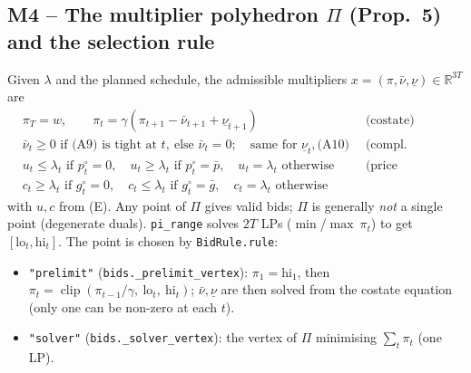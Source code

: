 \documentclass[10pt,a4paper]{article}
\newcommand{\code}[1]{\texttt{#1}}
\newcommand{\nuU}{\bar\nu}
\newcommand{\nuL}{\underline\nu}
\begin{document}
\subsection{M4 -- The multiplier polyhedron $\Pi$ (Prop.~5) and the selection rule}
Given $\lambda$ and the planned schedule, the admissible multipliers $x=(\pi,\nuU,\nuL)\in\mathbb R^{3T}$ are
\begin{align*}
&\pi_T = w,\qquad \pi_t = \gamma(\pi_{t+1}-\nuU_{t+1}+\nuL_{t+1}) && \text{(costate)}\\
&\nuU_t \ge 0 \text{ if (A9) is tight at } t,\ \text{else } \nuU_t=0;\quad \text{same for }\nuL_t,\text{(A10)} && \text{(compl.\ slackness)}\\
&u_t \le \lambda_t \text{ if } p^\circ_t=0,\quad u_t\ge\lambda_t \text{ if } p^\circ_t=\bar p,\quad u_t=\lambda_t \text{ otherwise} && \text{(price consistency)}\\
&c_t \ge \lambda_t \text{ if } g^\circ_t=0,\quad c_t\le\lambda_t \text{ if } g^\circ_t=\bar g,\quad c_t=\lambda_t \text{ otherwise}
\end{align*}
with $u,c$ from (E). Any point of $\Pi$ gives valid bids; $\Pi$ is generally \emph{not} a single point
(degenerate duals). \code{pi\_range} solves $2T$ LPs ($\min$/$\max\ \pi_t$) to get $[\mathrm{lo}_t,\mathrm{hi}_t]$.
The point is chosen by \code{BidRule.rule}:
\begin{itemize}
  \item \code{"prelimit"} (\code{bids.\_prelimit\_vertex}): $\pi_1=\mathrm{hi}_1$, then
    $\pi_t=\operatorname{clip}(\pi_{t-1}/\gamma,\ \mathrm{lo}_t,\ \mathrm{hi}_t)$; $\nuU,\nuL$ are then solved
    from the costate equation (only one can be non-zero at each $t$).
  \item \code{"solver"} (\code{bids.\_solver\_vertex}): the vertex of $\Pi$ minimising $\sum_t\pi_t$ (one LP).
\end{itemize}
\end{document}

